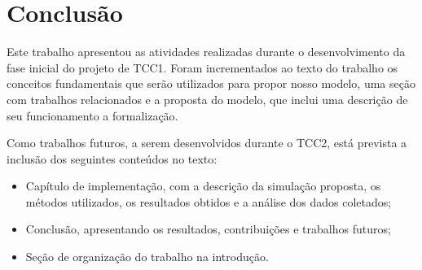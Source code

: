 \chapter{Conclusão}

Este trabalho apresentou as atividades realizadas durante o desenvolvimento da fase inicial do projeto de TCC1. Foram incrementados ao texto do trabalho os conceitos fundamentais que serão utilizados para propor nosso modelo, uma seção com trabalhos relacionados e a proposta do modelo, que inclui uma descrição de seu funcionamento a formalização.

Como trabalhos futuros, a serem desenvolvidos durante o TCC2, está prevista a inclusão dos seguintes conteúdos no texto:

\begin{itemize}
    \item Capítulo de implementação, com a descrição da simulação proposta, os métodos utilizados, os resultados obtidos e a análise dos dados coletados;
    \item Conclusão, apresentando os resultados, contribuições e trabalhos futuros;
    \item Seção de organização do trabalho na introdução.
\end{itemize}